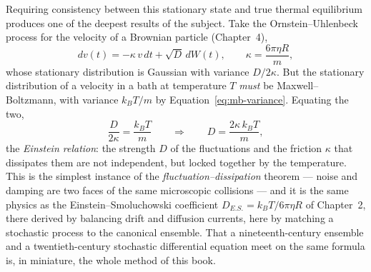 Requiring consistency between this stationary state and true thermal equilibrium produces one of the deepest results of the subject.
Take the Ornstein--Uhlenbeck process for the velocity of a Brownian particle (Chapter~4),
\begin{equation}\label{eq:ou-app}
dv(t) = -\kappa\, v\, dt + \sqrt{D}\, dW(t),
\qquad
\kappa = \frac{6\pi\eta R}{m},
\end{equation}
whose stationary distribution is Gaussian with variance $D/2\kappa$.
But the stationary distribution of a velocity in a bath at temperature $T$ \emph{must} be Maxwell--Boltzmann, with variance $k_B T/m$ by Equation~\eqref{eq:mb-variance}.
Equating the two,
\begin{equation}\label{eq:einstein-relation}
\frac{D}{2\kappa} = \frac{k_B T}{m}
\qquad\Longrightarrow\qquad
D = \frac{2\kappa\, k_B T}{m},
\end{equation}
the \emph{Einstein relation}: the strength $D$ of the fluctuations and the friction $\kappa$ that dissipates them are not independent, but locked together by the temperature.
This is the simplest instance of the \emph{fluctuation--dissipation} theorem --- noise and damping are two faces of the same microscopic collisions --- and it is the same physics as the Einstein--Smoluchowski coefficient $D_{E.S.} = k_B T/6\pi\eta R$ of Chapter~2, there derived by balancing drift and diffusion currents, here by matching a stochastic process to the canonical ensemble.
That a nineteenth-century ensemble and a twentieth-century stochastic differential equation meet on the same formula is, in miniature, the whole method of this book.
